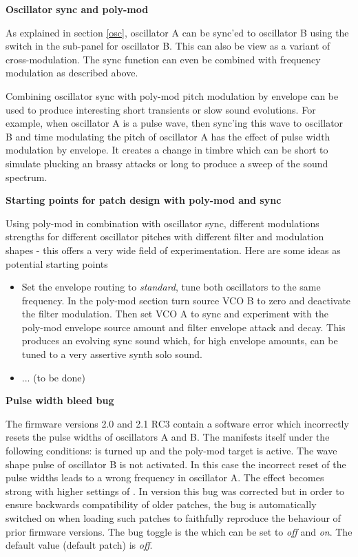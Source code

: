
\textbf{Oscillator sync and poly-mod}

As explained in section \ref{osc}, oscillator A can be sync'ed to oscillator B using the \oscsync switch in the sub-panel for oscillator B. This can also be view as a variant of cross-modulation. The sync function can even be combined with frequency modulation as described above. 

Combining oscillator sync with poly-mod pitch modulation by envelope can be used to produce interesting short transients or slow sound evolutions. For example, when oscillator A is a pulse wave, then sync'ing this wave to oscillator B and time modulating the pitch of oscillator A has the effect of pulse width modulation by envelope. It creates a change in timbre which can be short to simulate plucking an brassy attacks or long to produce a sweep of the sound spectrum.

\textbf{Starting points for patch design with poly-mod and sync}

Using poly-mod in combination with oscillator sync, different modulations strengths for different oscillator pitches with different filter and modulation shapes - this offers a very wide field of experimentation. Here are some ideas as potential starting points

\begin{itemize}
  \item Set the envelope routing to \textit{standard}, tune both oscillators to the same frequency. In the poly-mod section turn source VCO B to zero and deactivate the filter modulation. Then set VCO A to sync and experiment with the poly-mod envelope source amount and filter envelope attack and decay. This produces an evolving sync sound which, for high envelope amounts, can be tuned to a very assertive synth solo sound.
  \item ... (to be done)
\end{itemize} 

\textbf{Pulse width bleed bug}

The firmware versions 2.0 and 2.1 RC3 contain a software error which incorrectly resets the pulse widths of oscillators A and B. The manifests itself under the following conditions: \polymodosc is turned up and the poly-mod target \polymodfreq is active. The wave shape pulse of oscillator B is not activated. In this case the incorrect reset of the pulse widths leads to a wrong frequency in oscillator A. The effect becomes strong with higher settings of \polymodosc. In version \version this bug was corrected but in order to ensure backwards compatibility of older patches, the bug is automatically switched on when loading such patches to faithfully reproduce the behaviour of prior firmware versions.  The bug toggle is the \syncbug which can be set to \textit{off} and \textit{on}. The default value (default patch) is \textit{off}.

